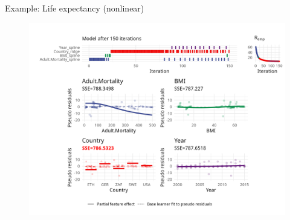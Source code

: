 \begin{frame}{Example: Life expectancy (nonlinear)}
	\begin{figure}
		\centering
		\includegraphics[width=\textwidth]{figure/cwb-anim-nl/fig-iter-0150.png}
	\end{figure}
	\addtocounter{framenumber}{-1}
\end{frame}


